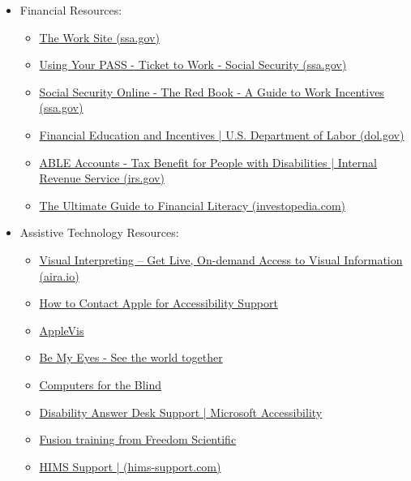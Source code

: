\begin{itemize}[leftmargin=*]
\begin{itemize}
\end{itemize}
\item Financial Resources:
\begin{itemize}
\item \href{https://www.ssa.gov/work/}{The Work Site (ssa.gov)}
\item \href{https://www.ssa.gov/redbook/}{Using Your PASS - Ticket to Work - Social Security (ssa.gov)}
\item \href{https://www.ssa.gov/redbook/}{Social Security Online - The Red Book - A Guide to Work Incentives (ssa.gov)}
\item \href{https://www.irs.gov/government-entities/federal-state-local-governments/able-accounts-tax-benefit-for-people-with-disabilities}{Financial Education and Incentives | U.S. Department of Labor (dol.gov)}
\item \href{https://www.irs.gov/government-entities/federal-state-local-governments/able-accounts-tax-benefit-for-people-with-disabilities}{ABLE Accounts - Tax Benefit for People with Disabilities | Internal Revenue Service (irs.gov)}
\item \href{https://www.investopedia.com/guide-to-financial-literacy-4800530}{The Ultimate Guide to Financial Literacy (investopedia.com)}
\end{itemize}
\item Assistive Technology Resources:
\begin{itemize}
\item \href{https://aira.io/#content}{Visual Interpreting – Get Live, On-demand Access to Visual Information (aira.io)}
\item \href{https://support.apple.com/en-us/HT209585}{How to Contact Apple for Accessibility Support}
\item \href{https://www.applevis.com/}{AppleVis}
\item \href{https://www.bemyeyes.com/}{Be My Eyes - See the world together}
\item \href{https://www.microsoft.com/en-us/Accessibility/disability-answer-desk?activetab=contact-pivot%3aprimaryr9}{Computers for the Blind}
\item \href{https://www.microsoft.com/en-us/Accessibility/disability-answer-desk?activetab=contact-pivot%3aprimaryr9}{Disability Answer Desk Support | Microsoft Accessibility}
\item \href{https://www.freedomscientific.com/training/fusion/}{Fusion training from Freedom Scientific}
\item \href{https://hims-support.com/}{HIMS Support | (hims-support.com)}

\end{itemize}
\end{itemize}
